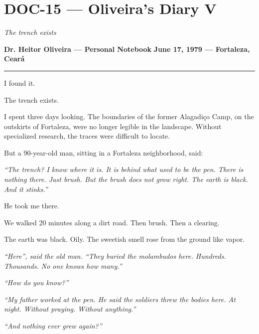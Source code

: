 \section*{\textbf{DOC-15} --- Oliveira's Diary V}

\noindent \textit{The trench exists}

\noindent \textbf{Dr. Heitor Oliveira --- Personal Notebook}
\textbf{June 17, 1979 --- Fortaleza, Ceará}

\vspace{0.5em}\noindent\rule{\textwidth}{0.5pt}\vspace{0.5em}

\noindent I found it.

\noindent The trench exists.

\noindent I spent three days looking. The boundaries of the former Alagadiço Camp, on the outskirts of Fortaleza, were no longer legible in the landscape. Without specialized research, the traces were difficult to locate.

\noindent But a 90-year-old man, sitting in a Fortaleza neighborhood, said:

\noindent \textit{\textquotedblleft{}The trench? I know where it is. It is behind what used to be the pen. There is nothing there. Just brush. But the brush does not grow right. The earth is black. And it stinks.\textquotedblright{}}

\noindent He took me there.

\noindent We walked 20 minutes along a dirt road. Then brush. Then a clearing.

\noindent The earth was black. Oily. The sweetish smell rose from the ground like vapor.

\noindent \textit{\textquotedblleft{}Here\textquotedblright{}\textit{, said the old man. }\textquotedblleft{}They buried the molambudos here. Hundreds. Thousands. No one knows how many.\textquotedblright{}}

\noindent \textit{\textquotedblleft{}How do you know?\textquotedblright{}}

\noindent \textit{\textquotedblleft{}My father worked at the pen. He said the soldiers threw the bodies here. At night. Without praying. Without anything.\textquotedblright{}}

\noindent \textit{\textquotedblleft{}And nothing ever grew again?\textquotedblright{}}

